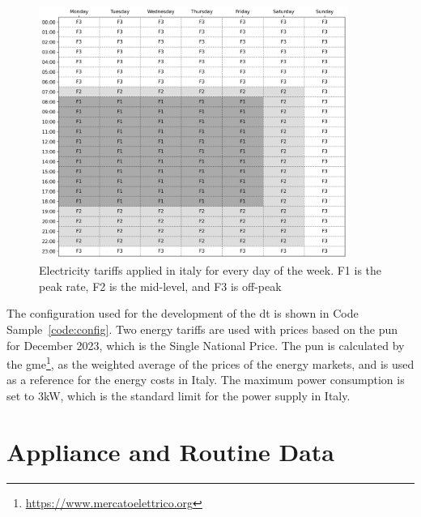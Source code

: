 \begin{figure}
    \centering
    \includegraphics[width=0.9\textwidth]{images/costs.png}
    \caption[Electricity tariffs applied in italy for every day of the week]{Electricity tariffs applied in italy for every day of the week. F1 is the peak rate, F2 is the mid-level, and F3 is off-peak}
    \label{fig:costs_matrix}
\end{figure}

The configuration used for the development of the \acrshort{dt} is shown in Code Sample~\ref{code:config}. Two energy tariffs are used with prices based on the \acrfull{pun} for December 2023, which is the Single National Price. The \acrshort{pun} is calculated by the \acrfull{gme}\footnote{\url{https://www.mercatoelettrico.org}}, as the weighted average of the prices of the energy markets, and is used as a reference for the energy costs in Italy. The maximum power consumption is set to 3kW, which is the standard limit for the power supply in Italy.

\section{Appliance and Routine Data}

